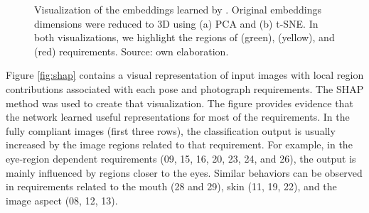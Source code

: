 \begin{figure}[tb]
\centering
{}
\caption{Visualization of the embeddings learned by \methodname. Original embeddings dimensions were reduced to 3D using (a) PCA and (b) t-SNE. In both visualizations, we highlight the regions of \variedbackground (green), \unnaturalskintone (yellow), and \veiloverface (red) requirements. Source: own elaboration.}
\label{fig:embviz}
\end{figure}

Figure \ref{fig:shap} contains a visual representation of input images with local region contributions associated with each pose and photograph requirements. The SHAP method was used to create that visualization. The figure provides evidence that the network learned useful representations for most of the requirements. In the fully compliant images (first three rows), the classification output is usually increased by the image regions related to that requirement. For example, in the eye-region dependent requirements (09, 15, 16, 20, 23, 24, and 26), the output is mainly influenced by regions closer to the eyes. Similar behaviors can be observed in requirements related to the mouth (28 and 29), skin (11, 19, 22), and the image aspect (08, 12, 13). 

